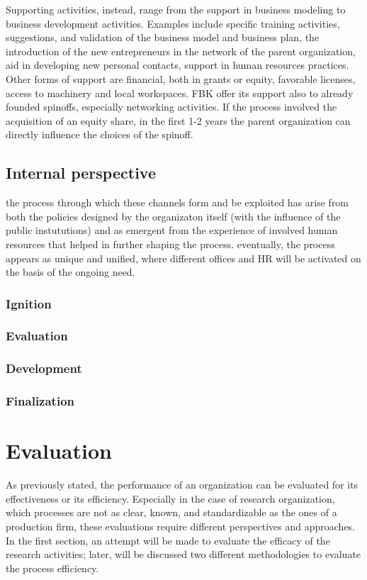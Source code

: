 Supporting activities, instead, range from the support in business modeling to business development activities. Examples include specific training activities, suggestions, and validation of the business model and business plan, the introduction of the new entrepreneurs in the network of the parent organization, aid in developing new personal contacts, support in human resources practices. Other forms of support are financial, both in grants or equity, favorable licenses, access to machinery and local workspaces. FBK offer its support also to already founded spinoffs, especially networking activities. If the process involved the acquisition of an equity share, in the first 1-2 years the parent organization can directly influence the choices of the spinoff.

\subsection{Internal perspective}

the process through which these channels form and be exploited has arise from both the policies designed by the organizaton itself (with the influence of the public instututions) and as emergent from the experience of involved human resources that helped in further shaping the process. eventually, the process appears as unique and unified, where different offices and HR will be activated on the basis of the ongoing need. 

\subsubsection{Ignition}
\subsubsection{Evaluation}
\subsubsection{Development}
\subsubsection{Finalization}

\section{Evaluation}

As previously stated, the performance of an organization can be evaluated for its effectiveness or its efficiency. Especially in the case of research organization, which processes are not as clear, known, and standardizable as the ones of a production firm, these evaluations require different perspectives and approaches. In the first section, an attempt will be made to evaluate the efficacy of the research activities; later, will be discussed two different methodologies to evaluate the process efficiency. 

